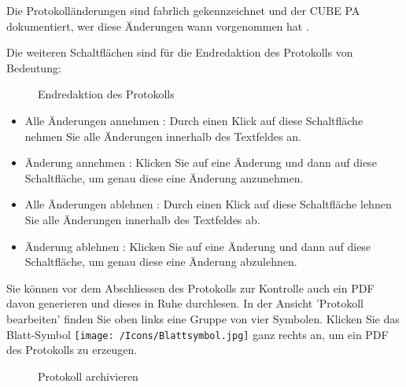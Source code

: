 Die Protokolländerungen sind fabrlich gekennzeichnet   und der CUBE PA dokumentiert, wer diese Änderungen wann vorgenommen hat .

\vspace{\baselineskip}

\clearpage

Die weiteren Schaltflächen sind für die Endredaktion des Protokolls von Bedeutung:

\begin{figure}[H]
\caption{Endredaktion des Protokolls}
\end{figure}

\begin{itemize}
\item
Alle Änderungen annehmen : Durch einen Klick auf diese Schaltfläche nehmen Sie alle Änderungen innerhalb des Textfeldes an.
\item
Änderung annehmen : Klicken Sie auf eine Änderung und dann auf diese Schaltfläche, um genau diese eine Änderung anzunehmen.
\item
Alle Änderungen ablehnen : Durch einen Klick auf diese Schaltfläche lehnen Sie alle Änderungen innerhalb des Textfeldes ab.
\item
Änderung ablehnen : Klicken Sie auf eine Änderung und dann auf diese Schaltfläche, um genau diese eine Änderung abzulehnen.
\end{itemize}

\vspace{\baselineskip}

Sie können vor dem Abschliessen des Protokolls zur Kontrolle auch ein PDF davon generieren und dieses in Ruhe durchlesen. In der Ansicht 'Protokoll bearbeiten' finden Sie oben links eine Gruppe von vier Symbolen. Klicken Sie das Blatt-Symbol \texttt{[image: /Icons/Blattsymbol.jpg]}  ganz rechts an, um ein PDF des Protokolls zu erzeugen.

\begin{figure}[H]
\caption{Protokoll archivieren}
\end{figure}

